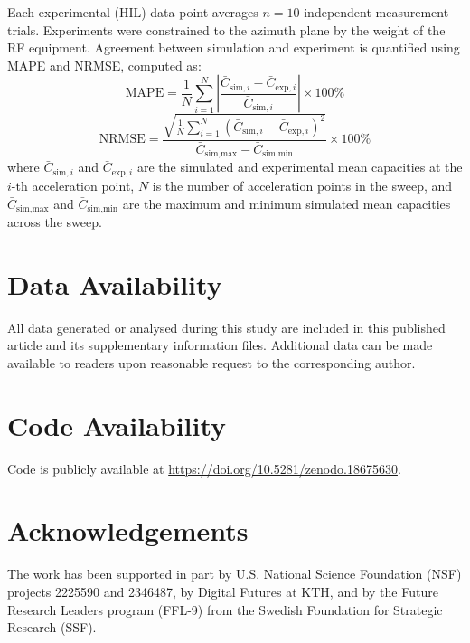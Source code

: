 \documentclass[fleqn,10pt]{wlscirep}
\begin{document}
Each experimental (HIL) data point averages $n = 10$ independent measurement trials. Experiments were constrained to the azimuth plane by the weight of the RF equipment. Agreement between simulation and experiment is quantified using MAPE and NRMSE, computed as:
\begin{equation}
    \text{MAPE} = \frac{1}{N} \sum_{i=1}^{N} \left| \frac{\bar{C}_{\text{sim},i} - \bar{C}_{\text{exp},i}}{\bar{C}_{\text{sim},i}} \right| \times 100\%
\end{equation}
\begin{equation}
    \text{NRMSE} = \frac{\sqrt{\frac{1}{N}\sum_{i=1}^{N}(\bar{C}_{\text{sim},i} - \bar{C}_{\text{exp},i})^2}}{\bar{C}_{\text{sim,max}} - \bar{C}_{\text{sim,min}}} \times 100\%
\end{equation}
where $\bar{C}_{\text{sim},i}$ and $\bar{C}_{\text{exp},i}$ are the simulated and experimental mean capacities at the $i$-th acceleration point, $N$ is the number of acceleration points in the sweep, and $\bar{C}_{\text{sim,max}}$ and $\bar{C}_{\text{sim,min}}$ are the maximum and minimum simulated mean capacities across the sweep.

\section*{Data Availability}
All data generated or analysed during this study are included in this published article and its supplementary information files. Additional data can be made available to readers upon reasonable request to the corresponding author.

\section*{Code Availability}
Code is publicly available at \url{https://doi.org/10.5281/zenodo.18675630}.

\section*{Acknowledgements}
The work has been supported in part by U.S. National Science Foundation (NSF) projects 2225590 and 2346487, by Digital Futures at KTH, and by the Future Research Leaders program (FFL-9) from the Swedish Foundation for Strategic Research (SSF).
\end{document}
